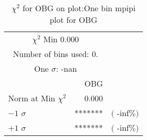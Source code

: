  \begin{table}[h!]\centering
 {\small{
 \begin{tabular}{||l||r||r||}
 \hline
 \hline
\multicolumn{2}{||c||}{$\chi^{2}$ Min   0.000} & \\
 \multicolumn{2}{||c||}{Number of bins used:   0.} & \\
\multicolumn{2}{||c||}{One $\sigma$:     -nan} & \\
 \hline
 \hline
    & OBG & \\
Norm at Min $\chi^{2}$  &   0.000 & \\
$-1$ $\sigma$ & *******  &  $($ -inf$\%)$  \\
$+1$ $\sigma$ & *******  &  $($ -inf$\%)$  \\
 \hline
 \hline
 \end{tabular}
 \caption{$\chi^{2}$ for OBG on plot:One bin mpipi plot for OBG}
 \label{tab-chiobg}
 }}
 \end{table}
 \endinput
